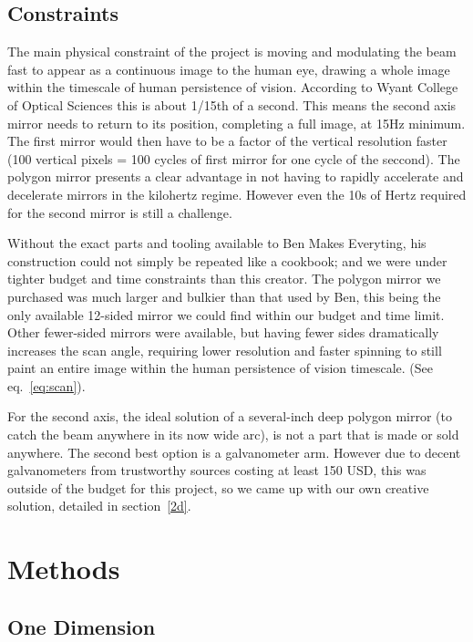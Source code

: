 \documentclass[twocolumn]{revtex4-2}
\begin{document}
\subsection{Constraints}
The main physical constraint of the project is moving and modulating the beam fast to appear as a continuous image to the human eye, drawing a whole image within the timescale of human persistence of vision. According to Wyant College of Optical Sciences \cite{wyant} this is about 1/15th of a second. This means the second axis mirror needs to return to its position, completing a full image, at 15Hz minimum. The first mirror would then have to be a factor of the vertical resolution faster (100 vertical pixels = 100 cycles of first mirror for one cycle of the seccond). The polygon mirror presents a clear advantage in not having to rapidly accelerate and decelerate mirrors in the kilohertz regime. However even the 10s of Hertz required for the second mirror is still a challenge.

Without the exact parts and tooling available to Ben Makes Everyting, his construction could not simply be repeated like a cookbook; and we were under tighter budget and time constraints than this creator. The polygon mirror we purchased was much larger and bulkier than that used by Ben, this being the only available 12-sided mirror we could find within our budget and time limit. Other fewer-sided mirrors were available, but having fewer sides dramatically increases the scan angle, requiring lower resolution and faster spinning to still paint an entire image within the human persistence of vision timescale. (See eq.~\ref{eq:scan}).

For the second axis, the ideal solution of a several-inch deep polygon mirror (to catch the beam anywhere in its now wide arc), is not a part that is made or sold anywhere. The second best option is a galvanometer arm. However due to decent galvanometers from trustworthy sources costing at least 150 USD, this was outside of the budget for this project, so we came up with our own creative solution, detailed in section~\ref{2d}.



\section{Methods}

\subsection{One Dimension}
\end{document}
